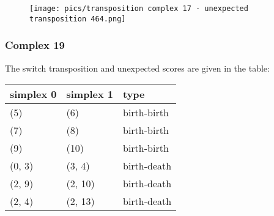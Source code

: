 \documentclass{article}
\begin{document}
\begin{figure}[ht]
\centering
\texttt{[image: pics/transposition complex 17 - unexpected transposition 464.png]}
\end{figure}


\subsubsection{Complex 19}
\par The switch transposition and unexpected scores are given in the table:
\begin{center}
\begin{tabular}{lll}
\toprule
simplex 0 & simplex 1 & type \\
\midrule
(5) & (6) & birth-birth \\
(7) & (8) & birth-birth \\
(9) & (10) & birth-birth \\
(0, 3) & (3, 4) & birth-death \\
(2, 9) & (2, 10) & birth-death \\
(2, 4) & (2, 13) & birth-death \\
\bottomrule
\end{tabular}
\end{center}
\end{document}
